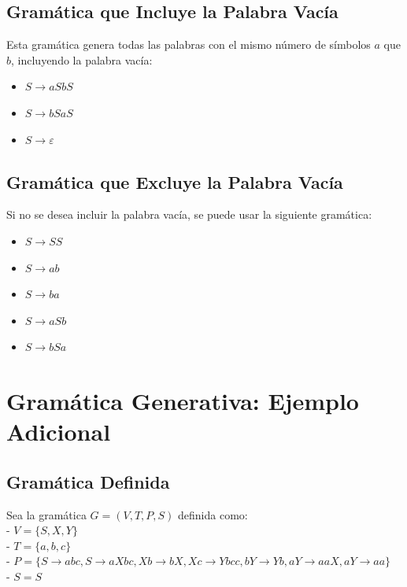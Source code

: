 \documentclass[12pt]{book} %
\providecommand{\tightlist}{%
  \setlength{\itemsep}{0pt}\setlength{\parskip}{0pt}}
\begin{document}
\hypertarget{gramuxe1tica-que-incluye-la-palabra-vacuxeda}{%
\subsection{Gramática que Incluye la Palabra
Vacía}\label{gramuxe1tica-que-incluye-la-palabra-vacuxeda}}

Esta gramática genera todas las palabras con el mismo número de símbolos
\(a\) que \(b\), incluyendo la palabra vacía:

\begin{itemize}
\tightlist
\item
  \(S \to aSbS\)
\item
  \(S \to bSaS\)
\item
  \(S \to \varepsilon\)
\end{itemize}

\hypertarget{gramuxe1tica-que-excluye-la-palabra-vacuxeda}{%
\subsection{Gramática que Excluye la Palabra
Vacía}\label{gramuxe1tica-que-excluye-la-palabra-vacuxeda}}

Si no se desea incluir la palabra vacía, se puede usar la siguiente
gramática:

\begin{itemize}
\tightlist
\item
  \(S \to SS\)
\item
  \(S \to ab\)
\item
  \(S \to ba\)
\item
  \(S \to aSb\)
\item
  \(S \to bSa\)
\end{itemize}

\hypertarget{gramuxe1tica-generativa-ejemplo-adicional}{%
\section{Gramática Generativa: Ejemplo
Adicional}\label{gramuxe1tica-generativa-ejemplo-adicional}}

\hypertarget{gramuxe1tica-definida-1}{%
\subsection{Gramática Definida}\label{gramuxe1tica-definida-1}}

Sea la gramática \(G = (V, T, P, S)\) definida como:\\
- \(V = \{S, X, Y\}\)\\
- \(T = \{a, b, c\}\)\\
-
\(P = \{  S \to abc,  S \to aXbc,  Xb \to bX,  Xc \to Ybcc,  bY \to Yb,  aY \to aaX,  aY \to aa \}\)\\
- \(S = S\)
\end{document}
